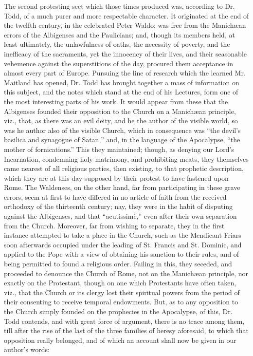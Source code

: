 The second protesting sect which those times produced was,
according to Dr. Todd, of a much purer and more respectable character.
It originated at the end of the twelfth century, in the celebrated
Peter Waldo; was free from the Manichæan errors of the Albigenses and
the Paulicians; and, though its members held, at least ultimately, the
unlawfulness of oaths, the necessity of poverty, and the inefficacy of
the sacraments, yet the innocency of their lives, and their seasonable
vehemence against the superstitions of the day, procured them
acceptance in almost every part of Europe. Pursuing the line of
research which the learned Mr. Maitland has opened, Dr. Todd has
brought together a mass of information on this subject, and the notes
which stand at the end of his Lectures, form one of the most
interesting parts of his work. It would appear from these that the
Albigenses founded their opposition to the Church on a Manichæan
principle, viz., that, as there was an evil deity, and he the author
of the visible world, so was he author also of the visible Church,
which in consequence was ``the devil's basilica and synagogue of
Satan,'' and, in the language of the Apocalypse, ``the mother
of fornications.'' This they maintained; though, as denying our
Lord's Incarnation, condemning holy matrimony, and prohibiting meats,
they themselves came nearest of all religious parties, then existing,
to that prophetic description, which they are at this day supposed by
their protest to have fastened upon Rome. The Waldenses, on the other
hand, far from participating in these grave errors, seem at first to
have differed in no article of faith from the received orthodoxy of
the thirteenth century; nay, they were in the habit of disputing
against the Albigenses, and that ``acutissimè,'' even after
their own separation from the Church. Moreover, far from wishing to
separate, they in the first instance attempted to take a place in the
Church, such as the Mendicant Friars soon afterwards occupied under
the leading of St. Francis and St. Dominic, and applied to the Pope
with a view of obtaining his sanction to their rules, and of being
permitted to found a religious order. Failing in this, they seceded,
and proceeded to denounce the Church of Rome, not on the Manichæan
principle, nor exactly on the Protestant, though on one which
Protestants have often taken, viz., that the Church or its clergy lost
their spiritual powers from the period of their consenting to receive
temporal endowments. But, as to any opposition to the Church simply
founded on the prophecies in the Apocalypse, of this, Dr. Todd
contends, and with great force of argument, there is no trace
among them, till after the rise of the last of the three families of
heresy aforesaid, to which that opposition really belonged, and of
which an account shall now be given in our author's words:

